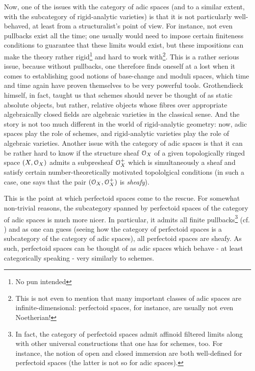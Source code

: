     	    Now, one of the issues with the category of adic spaces (and to a similar extent, with the subcategory of rigid-analytic varieties) is that it is not particularly well-behaved, at least from a structuralist's point of view. For instance, not even pullbacks exist all the time; one usually would need to impose certain finiteness conditions to guarantee that these limits would exist, but these impositions can make the theory rather rigid\footnote{No pun intended} and hard to work with\footnote{This is not even to mention that many important classes of adic spaces are infinite-dimensional: perfectoid spaces, for instance, are usually not even Noetherian!}. This is a rather serious issue, because without pullbacks, one therefore finds oneself at a lost when it comes to establishing good notions of base-change and moduli spaces, which time and time again have proven themselves to be very powerful tools. Grothendieck himself, in fact, taught us that schemes should never be thought of as static absolute objects, but rather, relative objects whose fibres over appropriate algebraically closed fields are algebraic varieties in the classical sense. And the story is not too much different in the world of rigid-analytic geometry: now, adic spaces play the role of schemes, and rigid-analytic varieties play the role of algebraic varieties. Another issue with the category of adic spaces is that it can be rather hard to know if the structure sheaf $\mathcal{O}_X$ of a given topologically ringed space $(X, \mathcal{O}_X)$ admits a subpresheaf $\mathcal{O}_X^+$ which is simultaneously a sheaf and satisfy certain number-theoretically motivated topololgical conditions (in such a case, one says that the pair $(\mathcal{O}_X, \mathcal{O}_X^+)$ is \textit{sheafy}).   
    	    
    	    This is the point at which perfectoid spaces come to the rescue. For somewhat non-trivial reasons, the subcategory spanned by perfectoid spaces of the category of adic spaces is much more nicer. In particular, it admits all finite pullbacks\footnote{In fact, the category of perfectoid spaces admit affinoid filtered limits along with other universal constructions that one has for schemes, too. For instance, the notion of open and closed immersion are both well-defined for perfectoid spaces (the latter is not so for adic spaces).} (cf. \cite[Proposition 6.18]{scholze2011perfectoid}) and as one can guess (seeing how the category of perfectoid spaces is a subcategory of the category of adic spaces), all perfectoid spaces are sheafy. As such, perfectoid spaces can be thought of as adic spaces which behave - at least categorically speaking - very similarly to schemes. 
    	    
